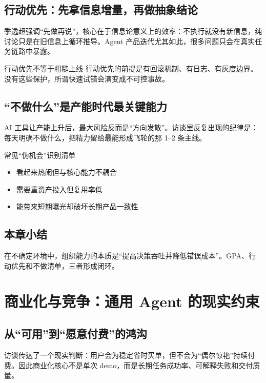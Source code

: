 \documentclass[a4paper]{article}
\begin{document}
\subsection{行动优先：先拿信息增量，再做抽象结论}

季逸超强调“先做再说”，核心在于信息论意义上的效率：不执行就没有新信息，纯讨论只是在旧信息上循环推导。Agent 产品迭代尤其如此，很多问题只会在真实任务链路中暴露。

\begin{warningbox}{行动优先不等于粗糙上线}
行动优先的前提是有回滚机制、有日志、有灰度边界。没有这些保护，所谓快速试错会演变成不可控事故。
\end{warningbox}

\subsection{“不做什么”是产能时代最关键能力}

AI 工具让产能上升后，最大风险反而是“方向发散”。访谈里反复出现的纪律是：每天明确不做什么，把精力留给最能形成飞轮的那 1--2 条主线。

\begin{knowledgebox}{常见“伪机会”识别清单}
\begin{itemize}
    \item 看起来热闹但与核心能力不耦合
    \item 需要重资产投入但复用率低
    \item 能带来短期曝光却破坏长期产品一致性
\end{itemize}
\end{knowledgebox}

\subsection{本章小结}

在不确定环境中，组织能力的本质是“提高决策吞吐并降低错误成本”。GPA、行动优先和不做清单，三者形成闭环。


\section{商业化与竞争：通用 Agent 的现实约束}

\subsection{从“可用”到“愿意付费”的鸿沟}

访谈传达了一个现实判断：用户会为稳定省时买单，但不会为“偶尔惊艳”持续付费。因此商业化核心不是单次 demo，而是长期任务成功率、可解释失败和交付质量。
\end{document}
